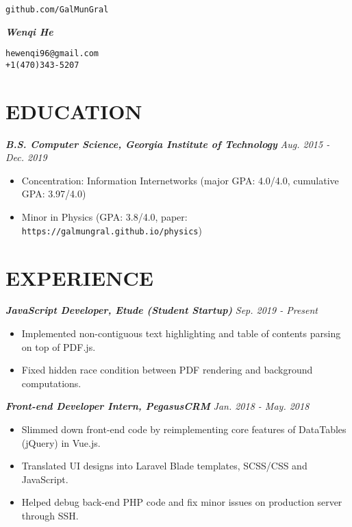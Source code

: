 \documentclass[12pt]{article}
\begin{document}
\noindent
\parbox{0.25\textwidth}{\hfill\texttt{github.com/GalMunGral}}
\parbox{0.5\textwidth}{\centerline{\Huge\slshape\bfseries Wenqi He}}
\parbox{0.25\textwidth}{\texttt{hewenqi96@gmail.com\\+1(470)343-5207}}

\section*{EDUCATION}
\textbf{\itshape B.S. Computer Science, Georgia Institute of Technology} \hfill \textit{\color{gray} Aug. 2015 - Dec. 2019}
\begin{itemize}[leftmargin=15pt, noitemsep, topsep=0pt]
	\item Concentration: Information Internetworks (major GPA: 4.0/4.0, cumulative GPA: 3.97/4.0)
	\item Minor in Physics (GPA: 3.8/4.0, paper: \texttt{https://galmungral.github.io/physics})
\end{itemize}
%
\section*{EXPERIENCE}
\textbf{\itshape JavaScript Developer, Etude (Student Startup)} \hfill \textit{\color{gray} Sep. 2019 - Present}
\begin{itemize}[leftmargin=15pt, noitemsep, topsep=0pt]
\item Implemented non-contiguous text highlighting and table of contents parsing on top of PDF.js.
\item Fixed hidden race condition between PDF rendering and background computations.
\end{itemize}
\vspace{1em}
\textbf{\itshape Front-end Developer Intern, PegasusCRM} \hfill \textit{\color{gray} Jan. 2018 - May. 2018}
\begin{itemize}[leftmargin=15pt, noitemsep, topsep=0pt]
	\item Slimmed down front-end code by reimplementing core features of DataTables (jQuery) in Vue.js.
	\item Translated UI designs into Laravel Blade templates, SCSS/CSS and JavaScript.
	\item Helped debug back-end PHP code and fix minor issues on production server through SSH.
\end{itemize}
\vspace{-0.5em}
%
\end{document}
